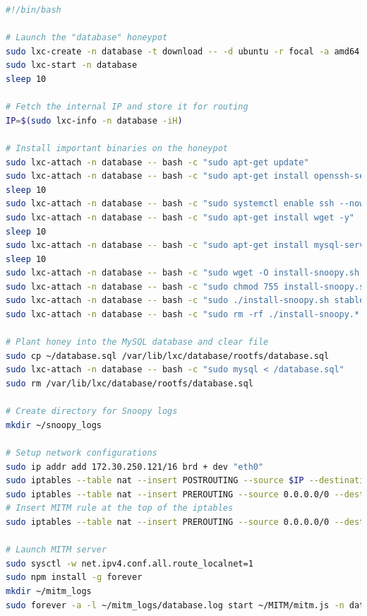 \documentclass[12pt]{article}
\begin{document}
\begin{lstlisting}[caption={honeypot.sh},language={bash}]
#!/bin/bash

# Launch the "database" honeypot
sudo lxc-create -n database -t download -- -d ubuntu -r focal -a amd64
sudo lxc-start -n database
sleep 10

# Fetch the internal IP and store it for routing
IP=$(sudo lxc-info -n database -iH)

# Install important binaries on the honeypot
sudo lxc-attach -n database -- bash -c "sudo apt-get update"
sudo lxc-attach -n database -- bash -c "sudo apt-get install openssh-server -y"
sleep 10
sudo lxc-attach -n database -- bash -c "sudo systemctl enable ssh --now"
sudo lxc-attach -n database -- bash -c "sudo apt-get install wget -y"
sleep 10
sudo lxc-attach -n database -- bash -c "sudo apt-get install mysql-server"
sleep 10
sudo lxc-attach -n database -- bash -c "sudo wget -O install-snoopy.sh https://github.com/a2o/snoopy/raw/install/install/install-snoopy.sh"
sudo lxc-attach -n database -- bash -c "sudo chmod 755 install-snoopy.sh"
sudo lxc-attach -n database -- bash -c "sudo ./install-snoopy.sh stable"
sudo lxc-attach -n database -- bash -c "sudo rm -rf ./install-snoopy.* snoopy-*"

# Plant honey into the MySQL database and clear file
sudo cp ~/database.sql /var/lib/lxc/database/rootfs/database.sql
sudo lxc-attach -n database -- bash -c "sudo mysql < /database.sql"
sudo rm /var/lib/lxc/database/rootfs/database.sql

# Create directory for Snoopy logs
mkdir ~/snoopy_logs

# Setup network configurations
sudo ip addr add 172.30.250.121/16 brd + dev "eth0"
sudo iptables --table nat --insert POSTROUTING --source $IP --destination 0.0.0.0/0 --jump SNAT --to-source 172.30.250.121
sudo iptables --table nat --insert PREROUTING --source 0.0.0.0/0 --destination 172.30.250.121 --jump DNAT --to-destination $IP
# Insert MITM rule at the top of the iptables
sudo iptables --table nat --insert PREROUTING --source 0.0.0.0/0 --destination 172.30.250.121 --protocol tcp --dport 22 --jump DNAT --to-destination 127.0.0.1:64646

# Launch MITM server
sudo sysctl -w net.ipv4.conf.all.route_localnet=1
sudo npm install -g forever
mkdir ~/mitm_logs
sudo forever -a -l ~/mitm_logs/database.log start ~/MITM/mitm.js -n database -i $IP -p 64646 --auto-access --auto-access-fixed 3 --debug
\end{lstlisting}
\end{document}
